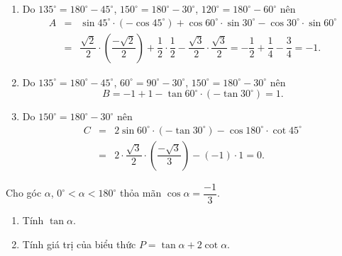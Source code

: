 \begin{bt}
{\begin{enumerate}
	\item Do $135^\circ=180^\circ-45^\circ$, $150^\circ=180^\circ-30^\circ$, $120^\circ=180^\circ-60^\circ$ nên 
	\allowdisplaybreaks
	\begin{eqnarray*}
		A&=&\sin 45^\circ\cdot(-\cos 45^\circ)+\cos 60^\circ\cdot\sin 30^\circ-\cos 30^\circ\cdot\sin 60^\circ\\
		&=&\dfrac{\sqrt{2}}{2}\cdot\left(\dfrac{-\sqrt{2}}{2}\right)+\dfrac{1}{2}\cdot\dfrac{1}{2}-\dfrac{\sqrt{3}}{2}\cdot\dfrac{\sqrt{3}}{2}=-\dfrac{1}{2}+\dfrac{1}{4}-\dfrac{3}{4}=-1.
	\end{eqnarray*}
\item Do $135^\circ=180^\circ-45^\circ$, $60^\circ=90^\circ-30^\circ$, $150^\circ=180^\circ-30^\circ$ nên
$$B=-1+1-\tan 60^\circ\cdot(-\tan 30^\circ)=1.$$
\item Do $150^\circ=180^\circ-30^\circ$ nên
\allowdisplaybreaks
\begin{eqnarray*}
	C&=&2\sin 60^\circ\cdot(-\tan 30^\circ)-\cos 180^\circ\cdot\cot 45^\circ\\
	&=&2\cdot\dfrac{\sqrt{3}}{2}\cdot\left(\dfrac{-\sqrt{3}}{3}\right)-(-1)\cdot 1=0.
\end{eqnarray*}
\end{enumerate}
}
\end{bt}

\begin{bt}%
Cho góc $\alpha$, $0^\circ<\alpha<180^\circ$ thỏa mãn $\cos\alpha=\dfrac{-1}{3}$.
\begin{enumerate}
	\item Tính $\tan\alpha$.
	\item Tính giá trị của biểu thức $P=\tan\alpha+2\cot\alpha$.
\end{enumerate}	
\end{bt}

